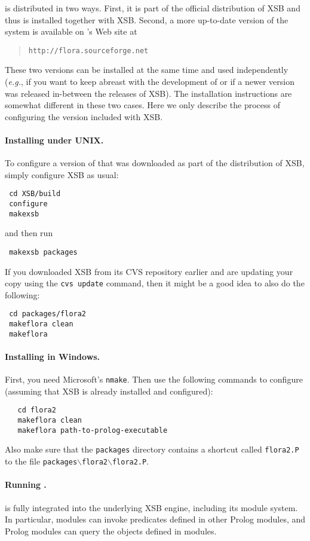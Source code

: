 \FLORA is distributed in two ways. First, it is part of the official
distribution of XSB and thus is installed together with XSB.  Second, a
more up-to-date version of the system is available on \FLORA's Web site at
\begin{quote}
  {\tt http://flora.sourceforge.net}
\end{quote}
These two versions can be
installed at the same time and used independently ({\it e.g.}, if you want
to keep abreast with the development of \FLORA or if a newer version was
released in-between the releases of XSB). The installation instructions are
somewhat different in these two cases. Here we only describe the process of
configuring the version \FLORA included with XSB.

\paragraph{Installing \FLORA under UNIX.}
To configure a version of \FLORA that was downloaded as part of the
distribution of XSB, simply configure XSB as usual:
\begin{verbatim}
 cd XSB/build
 configure
 makexsb
\end{verbatim}
and then run
\begin{verbatim}
 makexsb packages 
\end{verbatim}

If you downloaded XSB from its CVS repository earlier and are updating your
copy using the {\tt cvs update} command, then it might be a good idea to
also do the following: 
\begin{verbatim}
 cd packages/flora2
 makeflora clean
 makeflora
\end{verbatim}

\paragraph{Installing \FLORA in Windows.}
First, you need Microsoft's {\tt nmake}.
Then use the following commands to configure
\FLORA (assuming that XSB is already installed and configured):
\begin{verbatim}
   cd flora2
   makeflora clean
   makeflora path-to-prolog-executable
\end{verbatim}
Also make sure that the {\tt packages} directory contains a
shortcut called {\tt flora2.P} to the file
{\tt packages$\backslash$flora2$\backslash$flora2.P}.


\paragraph{Running \FLORA.}
\FLORA is fully integrated into the underlying XSB engine, including its
module system. In particular, \FLORA modules can invoke predicates defined in
other Prolog modules, and Prolog modules can query the objects defined in
\FLORA modules. 

